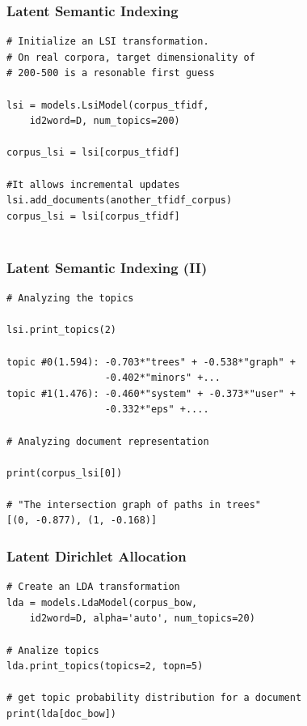 \documentclass{beamer}
\begin{document}
\begin{frame}[fragile]

    \frametitle{Latent Semantic Indexing}

\begin{verbatim}
# Initialize an LSI transformation. 
# On real corpora, target dimensionality of
# 200-500 is a resonable first guess

lsi = models.LsiModel(corpus_tfidf,
    id2word=D, num_topics=200)

corpus_lsi = lsi[corpus_tfidf]

#It allows incremental updates
lsi.add_documents(another_tfidf_corpus)
corpus_lsi = lsi[corpus_tfidf]
    
\end{verbatim}

\end{frame}

\begin{frame}[fragile]

    \frametitle{Latent Semantic Indexing (II)}

\begin{verbatim}
# Analyzing the topics

lsi.print_topics(2)

topic #0(1.594): -0.703*"trees" + -0.538*"graph" + 
                 -0.402*"minors" +...
topic #1(1.476): -0.460*"system" + -0.373*"user" + 
                 -0.332*"eps" +....

# Analyzing document representation

print(corpus_lsi[0])

# "The intersection graph of paths in trees" 
[(0, -0.877), (1, -0.168)]

\end{verbatim}

\end{frame}

\begin{frame}[fragile]

    \frametitle{Latent Dirichlet Allocation}

\begin{verbatim}
# Create an LDA transformation
lda = models.LdaModel(corpus_bow,
    id2word=D, alpha='auto', num_topics=20)
    
# Analize topics
lda.print_topics(topics=2, topn=5)

# get topic probability distribution for a document
print(lda[doc_bow])

\end{verbatim}

\end{frame}
\end{document}

